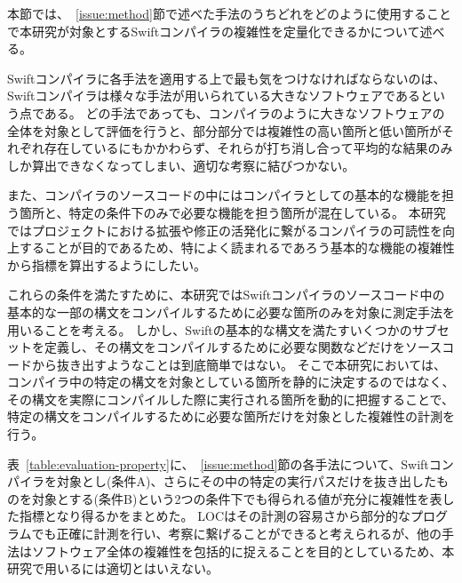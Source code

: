 本節では、~\ref{issue:method}節で述べた手法のうちどれをどのように使用することで本研究が対象とするSwiftコンパイラの複雑性を定量化できるかについて述べる。

Swiftコンパイラに各手法を適用する上で最も気をつけなければならないのは、Swiftコンパイラは様々な手法が用いられている大きなソフトウェアであるという点である。
どの手法であっても、コンパイラのように大きなソフトウェアの全体を対象として評価を行うと、部分部分では複雑性の高い箇所と低い箇所がそれぞれ存在しているにもかかわらず、それらが打ち消し合って平均的な結果のみしか算出できなくなってしまい、適切な考察に結びつかない。

また、コンパイラのソースコードの中にはコンパイラとしての基本的な機能を担う箇所と、特定の条件下のみで必要な機能を担う箇所が混在している。
本研究ではプロジェクトにおける拡張や修正の活発化に繋がるコンパイラの可読性を向上することが目的であるため、特によく読まれるであろう基本的な機能の複雑性から指標を算出するようにしたい。

これらの条件を満たすために、本研究ではSwiftコンパイラのソースコード中の基本的な一部の構文をコンパイルするために必要な箇所のみを対象に測定手法を用いることを考える。
しかし、Swiftの基本的な構文を満たすいくつかのサブセットを定義し、その構文をコンパイルするために必要な関数などだけをソースコードから抜き出すようなことは到底簡単ではない。
そこで本研究においては、コンパイラ中の特定の構文を対象としている箇所を静的に決定するのではなく、その構文を実際にコンパイルした際に実行される箇所を動的に把握することで、特定の構文をコンパイルするために必要な箇所だけを対象とした複雑性の計測を行う。

表~\ref{table:evaluation-property}に、~\ref{issue:method}節の各手法について、Swiftコンパイラを対象とし(条件A)、さらにその中の特定の実行パスだけを抜き出したものを対象とする(条件B)という2つの条件下でも得られる値が充分に複雑性を表した指標となり得るかをまとめた。
LOCはその計測の容易さから部分的なプログラムでも正確に計測を行い、考察に繋げることができると考えられるが、他の手法はソフトウェア全体の複雑性を包括的に捉えることを目的としているため、本研究で用いるには適切とはいえない。

